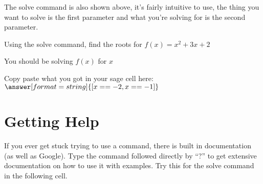 \documentclass{ximera}
\begin{document}
The solve command is also shown above, it's fairly intuitive to use, the thing you want to solve is the first parameter and what you're solving for is the second parameter.
\begin{question}
Using the solve command, find the roots for $f(x)=x^2+3x+2$
\begin{hint}
You should be solving $f(x)$ for $x$
\end{hint}
\begin{onlineOnly}
\begin{sageCell}

\end{sageCell}
\end{onlineOnly}
Copy paste what you got in your sage cell here: $\answer[format=string]{[x == -2, x == -1]}$
\end{question}



\section{Getting Help}
If you ever get stuck trying to use a command, there is built in documentation (as well as Google). Type the command followed directly by ``?'' to get extensive documentation on how to use it with examples. Try this for the solve command in the following cell.
\begin{onlineOnly}
\begin{sageCell}

\end{sageCell}
\end{onlineOnly}
\end{document}
